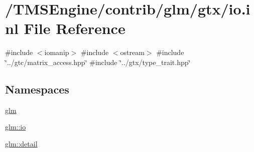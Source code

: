\hypertarget{io_8inl}{}\section{/\+T\+M\+S\+Engine/contrib/glm/gtx/io.inl File Reference}
\label{io_8inl}
{\ttfamily \#include $<$iomanip$>$}\newline
{\ttfamily \#include $<$ostream$>$}\newline
{\ttfamily \#include \char`\"{}../gtc/matrix\+\_\+access.\+hpp\char`\"{}}\newline
{\ttfamily \#include \char`\"{}../gtx/type\+\_\+trait.\+hpp\char`\"{}}\newline
\subsection*{Namespaces}
\begin{DoxyCompactItemize}
\item 
 \hyperlink{namespaceglm}{glm}
\item 
 \hyperlink{namespaceglm_1_1io}{glm\+::io}
\item 
 \hyperlink{namespaceglm_1_1detail}{glm\+::detail}
\end{DoxyCompactItemize}
